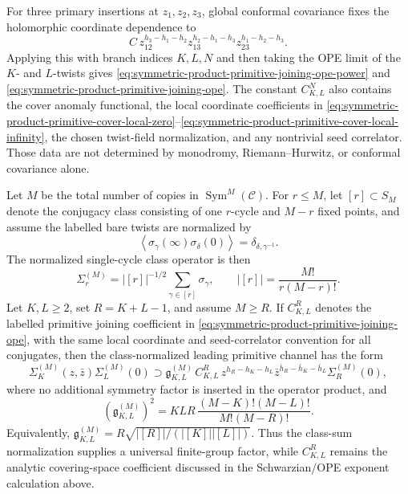 For three primary insertions at \(z_1,z_2,z_3\), global conformal covariance
fixes the holomorphic coordinate dependence to
\[
  C\,
  z_{12}^{h_3-h_1-h_2}
  z_{13}^{h_2-h_1-h_3}
  z_{23}^{h_1-h_2-h_3}.
\]
Applying this with branch indices \(K,L,N\) and then taking the OPE limit
of the \(K\)- and \(L\)-twists gives
\eqref{eq:symmetric-product-primitive-joining-ope-power} and
\eqref{eq:symmetric-product-primitive-joining-ope}.  The constant
\(C_{K,L}^{N}\) also contains the cover anomaly functional, the local
coordinate coefficients in
\eqref{eq:symmetric-product-primitive-cover-local-zero}--\eqref{eq:symmetric-product-primitive-cover-local-infinity},
the chosen twist-field normalization, and any nontrivial seed correlator.
Those data are not determined by monodromy, Riemann--Hurwitz, or conformal
covariance alone.

\begin{lemma}
\label{lem:symmetric-product-primitive-joining-class-normalization}
Let \(M\) be the total number of copies in
\(\operatorname{Sym}^M(\mathcal C)\).  For
\(r\le M\), let \([r]\subset S_M\) denote the conjugacy class consisting of
one \(r\)-cycle and \(M-r\) fixed points, and assume the labelled bare twists
are normalized by
\[
  \left\langle
    \sigma_\gamma(\infty)\sigma_\delta(0)
  \right\rangle
  =
  \delta_{\delta,\gamma^{-1}} .
\]
The normalized single-cycle class operator is then
\begin{equation}
  \Sigma_r^{(M)}
  =
  |[r]|^{-1/2}\sum_{\gamma\in[r]}\sigma_\gamma,
  \qquad
  |[r]|=\frac{M!}{r(M-r)!}.
  \label{eq:symmetric-product-normalized-single-cycle-class}
\end{equation}
Let \(K,L\ge2\), set \(R=K+L-1\), and assume \(M\ge R\).  If
\(C_{K,L}^{R}\) denotes the labelled primitive joining coefficient in
\eqref{eq:symmetric-product-primitive-joining-ope}, with the same local
coordinate and seed-correlator convention for all conjugates, then the
class-normalized leading primitive channel has the form
\begin{equation}
  \Sigma_K^{(M)}(z,\bar z)\Sigma_L^{(M)}(0)
  \supset
  \mathfrak g_{K,L}^{(M)}\,C_{K,L}^{R}\,
  z^{h_R-h_K-h_L}
  \bar z^{\bar h_R-\bar h_K-\bar h_L}
  \Sigma_R^{(M)}(0),
  \label{eq:symmetric-product-class-normalized-primitive-join-ope}
\end{equation}
where no additional symmetry factor is inserted in the operator product, and
\begin{equation}
  \left(\mathfrak g_{K,L}^{(M)}\right)^2
  =
  KLR\,
  \frac{(M-K)!(M-L)!}{M!(M-R)!}.
  \label{eq:symmetric-product-primitive-joining-group-factor}
\end{equation}
Equivalently,
\(\mathfrak g_{K,L}^{(M)}
=R\sqrt{|[R]|/(|[K]||[L]|)}\).  Thus the class-sum normalization supplies a
universal finite-group factor, while \(C_{K,L}^{R}\) remains the analytic
covering-space coefficient discussed in the Schwarzian/OPE exponent calculation
above.
\end{lemma}

